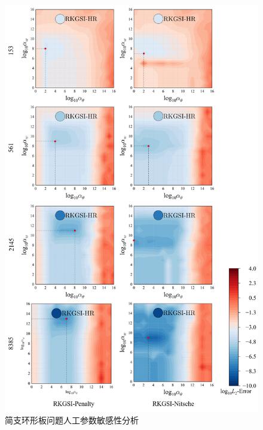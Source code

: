 \begin{figure}[H]
    \centering
    \includegraphics[scale=0.5]{figure/PHR/A/alpha.png}
    \caption{简支环形板问题人工参数敏感性分析}\label{Aalpha}
\end{figure}





